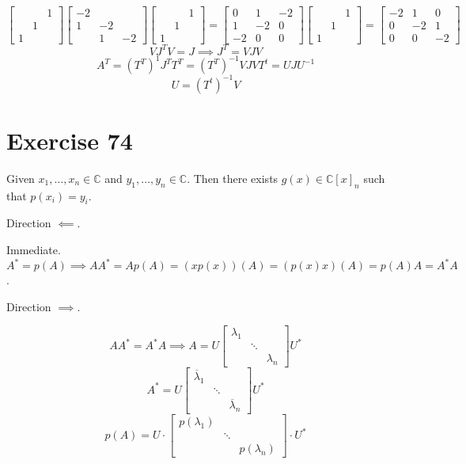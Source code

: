 \documentclass[a4paper]{article}
\theoremstyle{definition}
\begin{document}
\[
  \begin{bmatrix} & & 1 \\ & 1 & \\ 1 & & \end{bmatrix}
  \begin{bmatrix} -2 & & \\ 1 & -2 & \\ & 1 & -2 \end{bmatrix}
  \begin{bmatrix} & & 1 \\ & 1 & \\ 1 & & \end{bmatrix}
  =
  \begin{bmatrix} 0 & 1 & -2 \\ 1 & -2 & 0 \\ -2 & 0 & 0 \end{bmatrix}
  \begin{bmatrix} & & 1 \\ & 1 & \\ 1 & & \end{bmatrix}
  =
  \begin{bmatrix} -2 & 1 & 0 \\ 0 & -2 & 1 \\ 0 & 0 & -2 \end{bmatrix}
\] \[
  VJ^TV = J \implies J^T = VJV
\] \[
  A^T = (T^T)^1 J^T T^T = (T^T)^{-1} VJVT^t = UJU^{-1}
\] \[
  U = (T^t)^{-1} V
\]

\section{Exercise 74}

Given $x_1, \dots, x_n \in \mathbb C$ and $y_1, \dots, y_n \in \mathbb C$.
Then there exists $g(x) \in \mathbb C[x]_n$ such that $p(x_i) = y_i$.

Direction $\impliedby$.

Immediate. $A^* = p(A) \implies AA^* = Ap(A) = (x p(x))(A) = (p(x)x)(A) = p(A) A = A^* A$.

Direction $\implies$.

\[ AA^* = A^* A \implies A = U \begin{bmatrix} \lambda_1 & & \\ & \ddots & \\ & & \lambda_n \end{bmatrix} U^* \]
\[ A^* = U \begin{bmatrix} \overline{\lambda}_1 & & \\ & \ddots & \\ & & \overline{\lambda}_n \end{bmatrix} U^* \]
\[ p(A) = U \cdot \begin{bmatrix} p(\lambda_1) & & \\ & \ddots & \\ & & p(\lambda_n) \end{bmatrix} \cdot U^* \]
\end{document}
